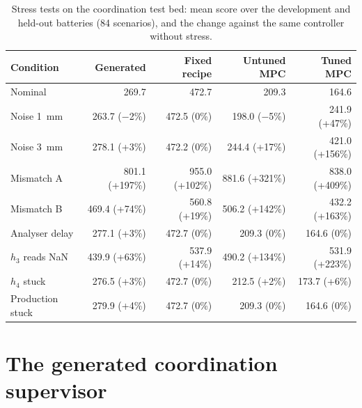 \begin{table}[tb]
  \centering
  \caption{Stress tests on the coordination test bed: mean score over the
    development and held-out batteries (84 scenarios), and the change against
    the same controller without stress.}
  \label{tab:coord-stress}
  \small\setlength{\tabcolsep}{3pt}
  \begin{tabular}{@{}lrrrr@{}}
    \toprule
    Condition & Generated & Fixed recipe & Untuned MPC & Tuned MPC \\
    \midrule
    Nominal             & 269.7          & 472.7          & 209.3          & 164.6 \\
    Noise 1~mm          & 263.7 ($-$2\%)   & 472.5 (0\%)    & 198.0 ($-$5\%)   & 241.9 (+47\%) \\
    Noise 3~mm          & 278.1 (+3\%)   & 472.2 (0\%)    & 244.4 (+17\%)  & 421.0 (+156\%) \\
    Mismatch A          & 801.1 (+197\%) & 955.0 (+102\%) & 881.6 (+321\%) & 838.0 (+409\%) \\
    Mismatch B          & 469.4 (+74\%)  & 560.8 (+19\%)  & 506.2 (+142\%) & 432.2 (+163\%) \\
    Analyser delay      & 277.1 (+3\%)   & 472.7 (0\%)    & 209.3 (0\%)    & 164.6 (0\%) \\
    $h_3$ reads NaN     & 439.9 (+63\%)  & 537.9 (+14\%)  & 490.2 (+134\%) & 531.9 (+223\%) \\
    $h_4$ stuck         & 276.5 (+3\%)   & 472.7 (0\%)    & 212.5 (+2\%)   & 173.7 (+6\%) \\
    Production stuck    & 279.9 (+4\%)   & 472.7 (0\%)    & 209.3 (0\%)    & 164.6 (0\%) \\
    \bottomrule
  \end{tabular}
\end{table}

\section{The generated coordination supervisor}
\label{sec:coord-champion}

